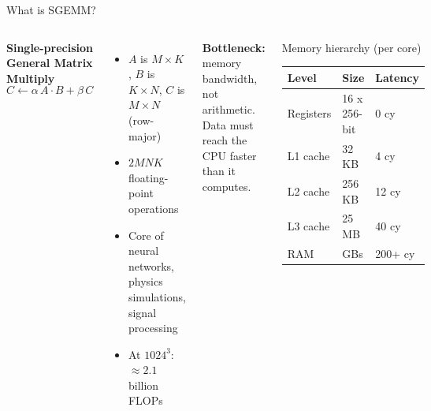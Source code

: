 \documentclass[aspectratio=169]{beamer}
\begin{document}
\begin{frame}{What is SGEMM?}
  \begin{columns}
    \textbf{Single-precision General Matrix Multiply}
    \[ C \leftarrow \alpha \, A \cdot B + \beta \, C \]
    \begin{itemize}
      \item $A$ is $M \times K$, $B$ is $K \times N$, $C$ is $M \times N$ (row-major)
      \item $2MNK$ floating-point operations
      \item Core of neural networks, physics simulations, signal processing
      \item At $1024^3$: $\approx 2.1$ billion FLOPs
    \end{itemize}
    \vspace{0.3cm}
    \textbf{Bottleneck:} memory bandwidth, not arithmetic.\\
    Data must reach the CPU faster than it computes.

    \begin{block}{Memory hierarchy (per core)}
      \footnotesize
      \begin{tabular}{lll}
        \toprule
        Level & Size & Latency \\
        \midrule
        Registers & 16 x 256-bit & 0 cy \\
        L1 cache & 32 KB & 4 cy \\
        L2 cache & 256 KB & 12 cy \\
        L3 cache & 25 MB & 40 cy \\
        RAM & GBs & 200+ cy \\
        \bottomrule
      \end{tabular}
    \end{block}
  \end{columns}
\end{frame}
\end{document}
